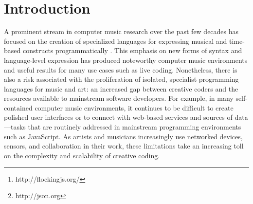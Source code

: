 \documentclass{article}
\title{\papertitle}
\begin{document}
\sloppy
%
\capstartfalse
\maketitle
\capstarttrue
%
\begin{abstract}
Flocking\footnote{http://flockingjs.org/} is a framework for audio synthesis and music composition written in JavaScript. It takes a unique approach to solving several of the common architectural problems faced by computer music environments, emphasizing a declarative style that is closely aligned with the principles of the web.

In Flocking, instruments and scores are defined as JavaScript Object Notation (JSON) objects. JSON is a subset of the JavaScript language that is used widely across the web for exchanging data.\footnote{http://json.org} Flocking's goal is to enable the growth of an ecosystem of tools that can easily parse and understand the logic and semantics of digital instruments by representing the basic building blocks of synthesis declaratively. This is particularly useful for supporting generative composition (where programs generate new instruments and scores algorithmically), graphical tools (for programmers and non-programmers alike to collaborate), and new modes of social programming that allow musicians to easily adapt, extend, and rework existing instruments without having to ``fork" their code.

Flocking provides a robust, optimized, and well-tested architecture that explicitly supports extensibility and long-term growth. Flocking runs in nearly any modern JavaScript environment, including desktop and mobile browsers (Chrome, Firefox, and Safari), as well as on embedded devices with Node.js.

\end{abstract}

\section{Introduction}\label{sec:introduction}

A prominent stream in computer music research over the past few decades has focused on the creation of specialized languages for expressing musical and time-based constructs programmatically \cite{dannenberg2002language,wang2003chuck,mccartney1996supercollider,orlarey2009faust}. This emphasis on new forms of syntax and language-level expression has produced noteworthy computer music environments and useful results for many use cases such as live coding. Nonetheless, there is also a risk associated with the proliferation of isolated, specialist programming languages for music and art: an increased gap between creative coders and the resources available to mainstream software developers. For example, in many self-contained computer music environments, it continues to be difficult to create polished user interfaces or to connect with web-based services and sources of data---tasks that are routinely addressed in mainstream programming environments such as JavaScript. As artists and musicians increasingly use networked devices, sensors, and collaboration in their work, these limitations take an increasing toll on the complexity and scalability of creative coding.
\end{document}
